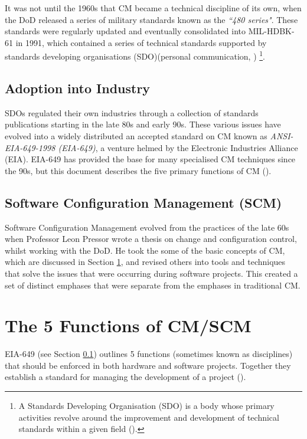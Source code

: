 \documentclass[cmpstyle]{ueacmpstyle}
\begin{document}
		It was not until the 1960s that CM became a technical discipline of its own, when the DoD released a series of military standards known as the \emph{``480 series"}. These standards were regularly updated and eventually consolidated into MIL-HDBK-61 in 1991, which contained a series of technical standards supported by standards developing organisations (SDO)(personal communication, \cite{dod-history}) \footnote{A Standards Developing Organisation (SDO) is a body whose primary activities revolve around the improvement and development of technical standards within a given field (\cite{history-standards}).}.
		
		\subsection{Adoption into Industry} \label{sec:adoption}
		SDOs regulated their own industries through a collection of standards publications starting in the late 80s and early 90s. These various issues have evolved into a widely distributed an accepted standard on CM known as \emph{ANSI-EIA-649-1998 (EIA-649)}, a venture helmed by the Electronic Industries Alliance (EIA). EIA-649 has provided the base for many specialised CM techniques since the 90s, but this document describes the five primary functions of CM (\cite{EIA-649}). 
		
		\subsection{Software Configuration Management (SCM)} \label{sec:scm}
		Software Configuration Management evolved from the practices of the late 60s when Professor Leon Pressor wrote a thesis on change and configuration control, whilst working with the DoD. He took the some of the basic concepts of CM, which are discussed in Section \ref{sec:principles}, and revised others into tools and techniques that solve the issues that were occurring during software projects. This created a set of distinct emphases that were separate from the emphases in traditional CM.
		
	\section{The 5 Functions of CM/SCM} \label{sec:principles}
	EIA-649 (see Section \ref{sec:adoption}) outlines 5 functions (sometimes known as disciplines) that should be enforced in both hardware and software projects. Together they establish a standard for managing the development of a project (\cite{mil-hdbk}). 
	
\end{document}
